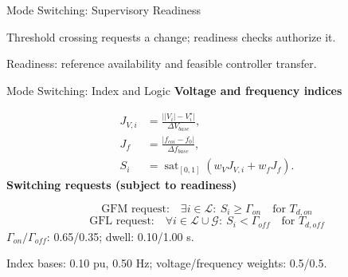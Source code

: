 \documentclass{beamer}
\begin{document}
\begin{frame}{Mode Switching: Supervisory Readiness}
\centering
{}
\par\bigskip
\footnotesize Threshold crossing requests a change; readiness checks authorize it.\par
\medskip
\scriptsize Readiness: reference availability and feasible controller transfer.\par
\end{frame}

\begin{frame}{Mode Switching: Index and Logic}
\footnotesize
\textbf{Voltage and frequency indices}\par
\begin{align}
J_{V,i}&=\frac{\bigl||V_i|-V_i^\star\bigr|}{\Delta V_{base}},\\
J_f&=\frac{|f_{coi}-f_0|}{\Delta f_{base}},\\
S_i&=\operatorname{sat}_{[0,1]}(w_VJ_{V,i}+w_fJ_f).
\end{align}
\medskip\footnotesize\textbf{Switching requests (subject to readiness)}\par
\begin{equation}
\text{GFM request:}\quad\exists i\in\mathcal L:\ S_i\ge\Gamma_{on}\quad\text{for }T_{d,on}
\end{equation}
\begin{equation}
\text{GFL request:}\quad\forall i\in\mathcal L\cup\mathcal G:\ S_i<\Gamma_{off}\quad\text{for }T_{d,off}
\end{equation}
\medskip
$\Gamma_{on}/\Gamma_{off}$: 0.65/0.35; dwell: 0.10/1.00 s.\par
Index bases: 0.10 pu, 0.50 Hz; voltage/frequency weights: 0.5/0.5.\par
\end{frame}
\end{document}
